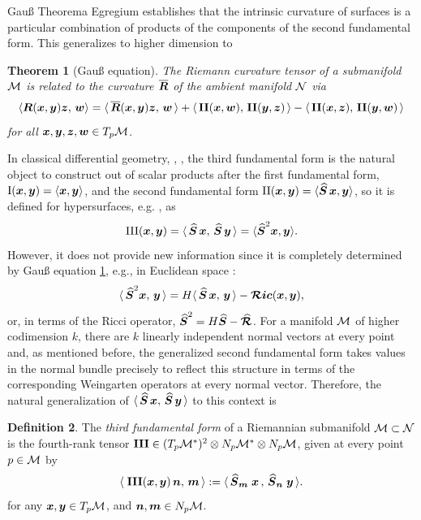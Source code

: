 \documentclass[letterpaper, reqno, 11pt]{amsart}
\newtheorem{theorem}{Theorem}[section]
\theoremstyle{definition}
\newtheorem{definition}[theorem]{Definition}
\theoremstyle{remark}
\numberwithin{equation}{section}
\begin{document}
Gau{\ss} Theorema Egregium establishes that the intrinsic curvature of surfaces is a particular combination of products of the components of the second fundamental form. This generalizes to higher dimension to %

\begin{theorem}[Gau{\ss} equation]\label{th:Gauss}
	The Riemann curvature tensor of a submanifold $\cM$ is related to the curvature $\bar{\bR}$ of the ambient manifold $\mc{N}$ via
\begin{equation}
	\Rie{\bx}{\by}{\bz}{\bw} = \metric{\bar{\bR}(\bx,\by)\bz}{\bw} +\metric{\II(\bx,\bw)}{\II(\by,\bz)} - \metric{\II(\bx,\bz)}{\II(\by,\bw)}
\end{equation}
for all $\bx,\by,\bz,\bw\in T_p\cM$.
\end{theorem}

In classical differential geometry, \cite{gray2006}, \cite{toponogov2006}, the third fundamental form is the natural object to construct out of scalar products after the first fundamental form, $\text{I}(\bx,\by)=\langle\bx,\by\rangle$, and the second fundamental form $\text{II}(\bx,\by)=\langle\oS\,\bx,\by\rangle$, so it is defined for hypersurfaces, e.g. \cite{liu1999}, as $$\text{III}(\bx,\by)=\metric{\oS\,\bx}{\oS\,\by} =\langle \oS^2\bx,\by\rangle.$$ However, it does not provide new information since it is completely determined by Gau{\ss} equation \ref{th:Gauss}, e.g., in Euclidean space \cite{kobayashi1969}:
\begin{equation}\label{eq:R-Wein}
\metric{\bs{\hat{S}}^2\bx}{\by}=H\metric{\oS\,\bx}{\by} - \Ric{\bx}{\by},	
\end{equation}
or, in terms of the Ricci operator, $\oS^2 = H\oS - \oR$. For a manifold $\cM$ of higher codimension $k$, there
are $k$ linearly independent normal vectors at every point and, as mentioned before, the generalized second fundamental form takes values in the normal bundle precisely to reflect this structure in terms of the corresponding Weingarten operators at every normal vector. Therefore, the natural generalization of $\metric{\oS\,\bx}{\oS\,\by}$ to this context is

\begin{definition}\label{def:III}
	The \emph{third fundamental form} of a Riemannian submanifold $\cM\subset\mc{N}$ is the fourth-rank tensor $\III\in (T_p\cM^*)^2\otimes N_p\cM^*\otimes N_p\cM$, given at every point $p\in\cM$ by
\begin{equation}
	\langle\; \III(\bx,\by)\,\bN,\,\bM\,\rangle := \langle\,\oS_{\bM}\;\bx\, ,\,\oS_{\bN}\;\by\,\rangle.
\end{equation}
for any $\bx,\by\in T_p\cM$, and $\bN,\bM\in N_p\cM$.
\end{definition}
\end{document}
